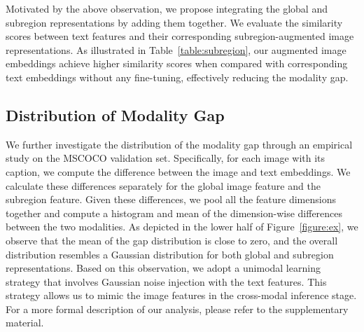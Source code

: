 Motivated by the above observation, we propose integrating the global and subregion representations by adding them together. We evaluate the similarity scores between text features and their corresponding subregion-augmented image representations. As illustrated in Table~\ref{table:subregion}, our augmented image embeddings achieve higher similarity scores when compared with corresponding text embeddings without any fine-tuning, effectively reducing the modality gap.

\subsection{Distribution of Modality Gap}
We further investigate the distribution of the modality gap through an empirical study on the MSCOCO validation set. Specifically, for each image with its caption, we compute the difference between the image and text embeddings. We calculate these differences separately for the global image feature and the subregion feature. Given these differences, we pool all the feature dimensions together and compute a histogram and mean of the dimension-wise differences between the two modalities. As depicted in the lower half of Figure~\ref{figure:ex}, we observe that the mean of the gap distribution is close to zero, and the overall distribution resembles a Gaussian distribution for both global and subregion representations. Based on this observation, we adopt a unimodal learning strategy that involves Gaussian noise injection with the text features. This strategy allows us to mimic the image features in the cross-modal inference stage. For a more formal description of our analysis, please refer to the supplementary material.



